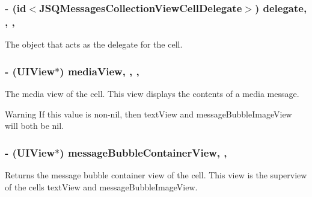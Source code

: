 \subsubsection[{delegate}]{\setlength{\rightskip}{0pt plus 5cm}-\/ (id$<${\bf J\+S\+Q\+Messages\+Collection\+View\+Cell\+Delegate}$>$) delegate\hspace{0.3cm}{\ttfamily [read]}, {\ttfamily [write]}, {\ttfamily [nonatomic]}, {\ttfamily [weak]}}\label{interface_j_s_q_messages_collection_view_cell_a4b7a40e8a0fc1a0e32c8817286385737}
The object that acts as the delegate for the cell. \hypertarget{interface_j_s_q_messages_collection_view_cell_afa76abf130341fe6e18db8b544f22282}{}
\subsubsection[{media\+View}]{\setlength{\rightskip}{0pt plus 5cm}-\/ (U\+I\+View$\ast$) media\+View\hspace{0.3cm}{\ttfamily [read]}, {\ttfamily [write]}, {\ttfamily [nonatomic]}, {\ttfamily [weak]}}\label{interface_j_s_q_messages_collection_view_cell_afa76abf130341fe6e18db8b544f22282}
The media view of the cell. This view displays the contents of a media message.

\begin{DoxyWarning}{Warning}
If this value is non-\/nil, then text\+View and message\+Bubble\+Image\+View will both be {\ttfamily nil}. 
\end{DoxyWarning}
\hypertarget{interface_j_s_q_messages_collection_view_cell_a0944e4a1d12b598eef21a2c158cef6e8}{}
\subsubsection[{message\+Bubble\+Container\+View}]{\setlength{\rightskip}{0pt plus 5cm}-\/ (U\+I\+View$\ast$) message\+Bubble\+Container\+View\hspace{0.3cm}{\ttfamily [read]}, {\ttfamily [nonatomic]}, {\ttfamily [weak]}}\label{interface_j_s_q_messages_collection_view_cell_a0944e4a1d12b598eef21a2c158cef6e8}
Returns the message bubble container view of the cell. This view is the superview of the cell\textquotesingle{}s text\+View and message\+Bubble\+Image\+View.

